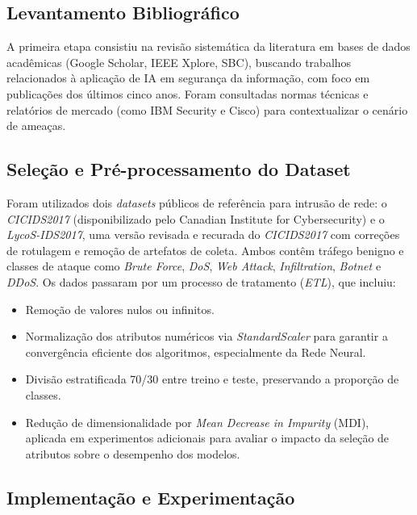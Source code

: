 \subsection{Levantamento Bibliográfico}

A primeira etapa consistiu na revisão sistemática da literatura em bases de dados acadêmicas (Google Scholar, IEEE Xplore, SBC), buscando trabalhos relacionados à aplicação de IA em segurança da informação, com foco em publicações dos últimos cinco anos. Foram consultadas normas técnicas e relatórios de mercado (como IBM Security e Cisco) para contextualizar o cenário de ameaças.

\subsection{Seleção e Pré-processamento do Dataset}

Foram utilizados dois \textit{datasets} públicos de referência para intrusão de rede: o \textit{CICIDS2017} (disponibilizado pelo Canadian Institute for Cybersecurity) e o \textit{LycoS-IDS2017}, uma versão revisada e recurada do \textit{CICIDS2017} com correções de rotulagem e remoção de artefatos de coleta. Ambos contêm tráfego benigno e classes de ataque como \textit{Brute Force}, \textit{DoS}, \textit{Web Attack}, \textit{Infiltration}, \textit{Botnet} e \textit{DDoS}. Os dados passaram por um processo de tratamento (\textit{ETL}), que incluiu:

\begin{itemize}
\item Remoção de valores nulos ou infinitos.
\item Normalização dos atributos numéricos via \textit{StandardScaler} para garantir a convergência eficiente dos algoritmos, especialmente da Rede Neural.
\item Divisão estratificada 70/30 entre treino e teste, preservando a proporção de classes.
\item Redução de dimensionalidade por \textit{Mean Decrease in Impurity} (MDI), aplicada em experimentos adicionais para avaliar o impacto da seleção de atributos sobre o desempenho dos modelos.
\end{itemize}

\subsection{Implementação e Experimentação}

